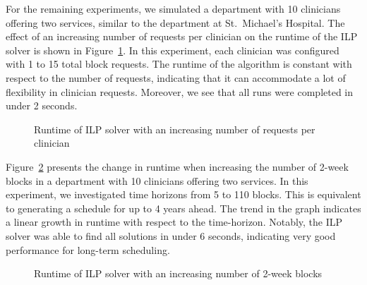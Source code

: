 

For the remaining experiments, we simulated a department with 10 clinicians offering 
two services, similar to the department at St.\ Michael's Hospital. 
The effect of an increasing number of requests per clinician on the runtime of
the ILP solver is shown in Figure~\ref{fig:runtime-requests}.
In this experiment, each clinician was configured with 1 to 15 total block requests.
The runtime of the algorithm is constant with respect to the number of requests,
indicating that it can accommodate a lot of flexibility in
clinician requests. Moreover, we see that all runs were completed in under
2 seconds.

\begin{figure}[h]
	\centering
	\def\svgwidth{\columnwidth}
	\caption{Runtime of ILP solver with an increasing number of requests per clinician}
  \label{fig:runtime-requests}
\end{figure}

Figure~\ref{fig:runtime-blocks} presents the change in runtime when increasing
the number of 2-week blocks in a department with 10
clinicians offering two services. In this experiment, we investigated time horizons
from 5 to 110 blocks. This is equivalent to generating a schedule for up to 4 years ahead.
The trend in the graph indicates a linear growth in runtime with respect to the time-horizon.
Notably, the ILP solver was able to find all solutions in under 6 seconds, indicating very 
good performance for long-term scheduling. 

\begin{figure}[h]
	\centering
	\def\svgwidth{\textwidth}
	\caption{Runtime of ILP solver with an increasing number of 2-week blocks}%
	
  \label{fig:runtime-blocks}
\end{figure}